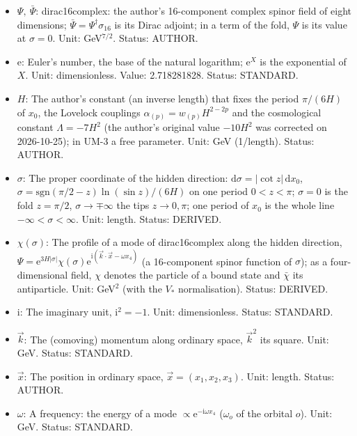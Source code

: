 \documentclass[
  10pt,
]{article}
\providecommand{\tightlist}{%
  \setlength{\itemsep}{0pt}\setlength{\parskip}{0pt}}
\begin{document}
\begin{itemize}
\tightlist
\item
  \(\Psi,\ \bar\Psi\): dirac16complex: the author's 16-component complex
  spinor field of eight dimensions;
  \(\bar\Psi = \Psi^\dagger\sigma_{16}\) is its Dirac adjoint; in a term
  of the fold, \(\Psi\) is its value at \(\sigma = 0\). Unit:
  GeV\(^{7/2}\). Status: AUTHOR.
\item
  \(\mathrm{e}\): Euler's number, the base of the natural logarithm;
  \(\mathrm{e}^{X}\) is the exponential of \(X\). Unit: dimensionless.
  Value: 2.718281828. Status: STANDARD.
\item
  \(H\): The author's constant (an inverse length) that fixes the period
  \(\pi/(6H)\) of \(x_0\), the Lovelock couplings
  \(\alpha_{(p)} = w_{(p)}H^{2-2p}\) and the cosmological constant
  \(\Lambda = -7H^2\) (the author's original value \(-10H^2\) was
  corrected on 2026-10-25); in UM-3 a free parameter. Unit: GeV
  (1/length). Status: AUTHOR.
\item
  \(\sigma\): The proper coordinate of the hidden direction:
  \(\mathrm{d}\sigma = \lvert\cot z\rvert\,\mathrm{d}x_0\),
  \(\sigma = \mathrm{sgn}(\pi/2 - z)\ln(\sin z)/(6H)\) on one period
  \(0 < z < \pi\); \(\sigma = 0\) is the fold \(z = \pi/2\),
  \(\sigma \to \mp\infty\) the tips \(z \to 0, \pi\); one period of
  \(x_0\) is the whole line \(-\infty < \sigma < \infty\). Unit: length.
  Status: DERIVED.
\item
  \(\chi(\sigma)\): The profile of a mode of dirac16complex along the
  hidden direction,
  \(\Psi = \mathrm{e}^{3H\lvert\sigma\rvert}\chi(\sigma)\mathrm{e}^{\mathrm{i}(\vec k\cdot\vec x - \omega x_4)}\)
  (a 16-component spinor function of \(\sigma\)); as a four-dimensional
  field, \(\chi\) denotes the particle of a bound state and \(\bar\chi\)
  its antiparticle. Unit: GeV\(^{2}\) (with the \(V_*\) normalisation).
  Status: DERIVED.
\item
  \(\mathrm{i}\): The imaginary unit, \(\mathrm{i}^2 = -1\). Unit:
  dimensionless. Status: STANDARD.
\item
  \(\vec k\): The (comoving) momentum along ordinary space, \(\vec k^2\)
  its square. Unit: GeV. Status: STANDARD.
\item
  \(\vec x\): The position in ordinary space,
  \(\vec x = (x_1, x_2, x_3)\). Unit: length. Status: AUTHOR.
\item
  \(\omega\): A frequency: the energy of a mode
  \(\propto \mathrm{e}^{-\mathrm{i}\omega x_4}\) (\(\omega_o\) of the
  orbital \(o\)). Unit: GeV. Status: STANDARD.

\end{itemize}
\end{document}
